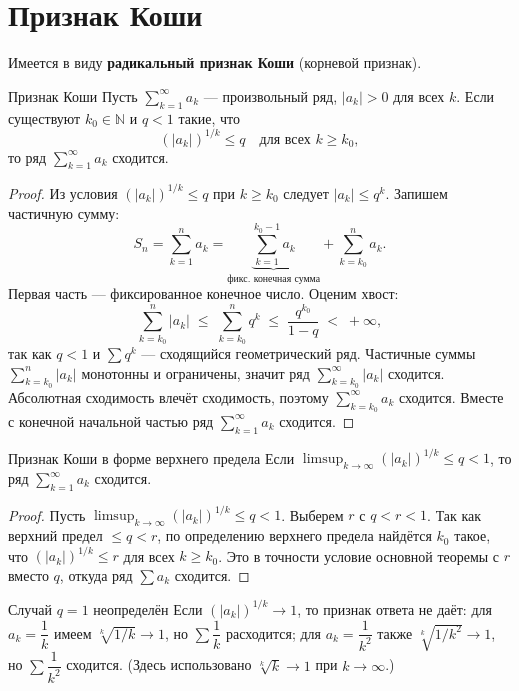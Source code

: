 
\section{Признак Коши}

Имеется в виду \textbf{радикальный признак Коши} (корневой признак).

\begin{Theorem}{Признак Коши}{}
	Пусть $\sum_{k=1}^{\infty} a_k$ --- произвольный ряд, $|a_k| > 0$ для
	всех $k$. Если существуют $k_0 \in \mathbb{N}$ и $q < 1$ такие, что
	\[
	(|a_k|)^{1/k} \le q
	\quad \text{для всех } k \ge k_0,
	\]
	то ряд $\sum_{k=1}^{\infty} a_k$ сходится.
\end{Theorem}

\begin{proof}
	Из условия $(|a_k|)^{1/k} \le q$ при $k \ge k_0$ следует $|a_k| \le q^k$.
	Запишем частичную сумму:
	\[
	S_n = \sum_{k=1}^{n} a_k
	= \underbrace{\sum_{k=1}^{k_0-1} a_k}_{\text{фикс. конечная сумма}}
	+ \sum_{k=k_0}^{n} a_k.
	\]
	Первая часть --- фиксированное конечное число. Оценим хвост:
	\[
	\sum_{k=k_0}^{n} |a_k|
	\;\le\; \sum_{k=k_0}^{n} q^k
	\;\le\; \frac{q^{k_0}}{1-q}
	\;<\; +\infty,
	\]
	так как $q < 1$ и $\sum q^k$ --- сходящийся геометрический ряд. Частичные
	суммы $\sum_{k=k_0}^{n} |a_k|$ монотонны и ограничены, значит ряд
	$\sum_{k=k_0}^{\infty} |a_k|$ сходится. Абсолютная сходимость влечёт
	сходимость, поэтому $\sum_{k=k_0}^{\infty} a_k$ сходится. Вместе с конечной
	начальной частью ряд $\sum_{k=1}^{\infty} a_k$ сходится.
\end{proof}

\begin{Corollary}{Признак Коши в форме верхнего предела}{}
	Если $\displaystyle\limsup_{k\to\infty}(|a_k|)^{1/k} \le q < 1$, то ряд
	$\sum_{k=1}^{\infty} a_k$ сходится.
\end{Corollary}

\begin{proof}
	Пусть $\limsup_{k\to\infty}(|a_k|)^{1/k} \le q < 1$. Выберем $r$ с $q < r < 1$.
	Так как верхний предел $\le q < r$, по определению верхнего предела найдётся
	$k_0$ такое, что $(|a_k|)^{1/k} \le r$ для всех $k \ge k_0$. Это в точности
	условие основной теоремы с $r$ вместо $q$, откуда ряд $\sum a_k$ сходится.
\end{proof}

\begin{Remark}{Случай $q = 1$ неопределён}{}
	Если $(|a_k|)^{1/k} \to 1$, то признак ответа не даёт: для $a_k = \dfrac{1}{k}$
	имеем $\sqrt[k]{1/k} \to 1$, но $\sum\dfrac{1}{k}$ расходится; для
	$a_k = \dfrac{1}{k^2}$ также $\sqrt[k]{1/k^2} \to 1$, но $\sum\dfrac{1}{k^2}$
	сходится. (Здесь использовано $\sqrt[k]{k} \to 1$ при $k \to \infty$.)
\end{Remark}

